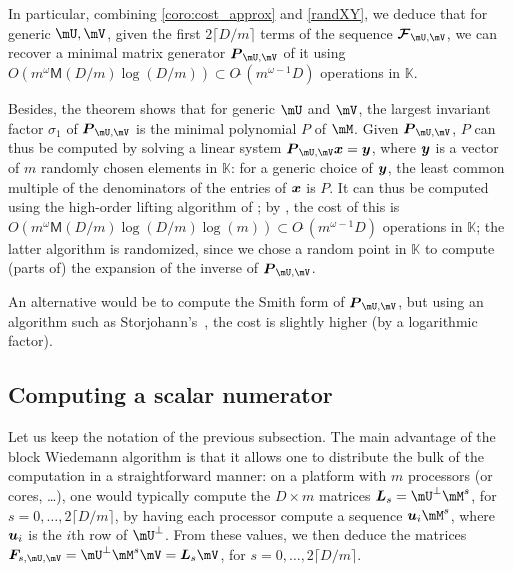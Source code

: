 \documentclass[12pt]{article}
\newcommand{\mat}[1]{\bm{\MakeUppercase{#1}}} %
\newcommand{\row}[1]{\bm{\MakeLowercase{#1}}} %
\newcommand{\col}[1]{\bm{\MakeLowercase{#1}}} %
\newcommand{\seqelt}[1]{\bm{F}_{#1}} %
\newcommand{\seq}{\mat{\mathcal{F}}} %
\newcommand{\softO}[1]{O{\tilde{~}}(#1)} %
\newcommand{\minpoly}{P}
\def\M {\ensuremath{\mathsf{M}}}
\def\K{\mathbb{K}}
\def\K {\ensuremath{\mathbb{K}}}
\begin{document}
In particular, combining \cref{coro:cost_approx} and \cref{randXY}, we
deduce that for generic $\mU,\mV$, given the first $2 \lceil D/m
\rceil$ terms of the sequence $\seq_{\mU,\mV}$, we can recover a
minimal matrix generator  $\mat{P}_{\mU,\mV}$ of it using $O(m^\omega \M(D/m) \log(D/m))
\subset \softO{m^{\omega-1} D}$ operations in $\K$.

Besides, the theorem shows that for generic $\mU$ and $\mV$, the
largest invariant factor $\sigma_1$ of $\mat{P}_{\mU,\mV}$ is the
minimal polynomial $\minpoly$ of $\mM$.  Given $\mat{P}_{\mU,\mV}$,
$\minpoly$ can thus be computed by solving a linear system
$\mat{P}_{\mU,\mV} \col{x} = \col{y}$, where $\col{y}$ is a vector of
$m$ randomly chosen elements in $\K$: for a generic choice of
$\col{y}$, the least common multiple of the denominators of the
entries of $\col{x}$ is $\minpoly$.  It can thus be computed using the
high-order lifting algorithm of \cite[Algorithm~5]{Stor03}; by
\cite[Corollary~16]{Stor03}, the cost of this is $O(m^{\omega} \M(D/m)
\log(D/m) \log(m)) \subset \softO{m^{\omega-1}D}$ operations in $\K$;
the latter algorithm is randomized, since we chose a random point in
$\K$ to compute (parts of) the expansion of the inverse of
$\mat{P}_{\mU,\mV}$.

An alternative would be to compute the Smith form of
$\mat{P}_{\mU,\mV}$, but using an algorithm such as
Storjohann's~\cite{Stor03}, the cost is slightly higher (by a
logarithmic factor).


\subsection{Computing a scalar numerator}\label{ssec:scalar_numer}

Let us keep the notation of the previous subsection.  The main
advantage of the block Wiedemann algorithm is that it allows one to
distribute the bulk of the computation in a straightforward manner: on
a platform with $m$ processors (or cores, \dots), one would typically
compute the $D \times m$ matrices $\mat{L}_s=\mU^\perp\mM^s$, for
$s=0,\dots,2\lceil D/m \rceil$, by having each processor compute a
sequence $\row{u}_i \mM^s$, where $\row{u}_i$ is the $i$th row of
$\mU^\perp$. From these values, we then deduce the matrices
$\seqelt{s,\mU,\mV}=\mU^\perp \mM^s \mV = \mat{L}_s\mV$, for
$s=0,\dots,2\lceil D/m \rceil$.
\end{document}
